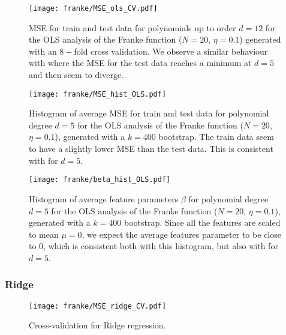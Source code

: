             
            \begin{figure}
                \texttt{[image: franke/MSE\_ols\_CV.pdf]}
                \caption{MSE for train and test data for polynomials up to order $d=12$ for the OLS analysis of the Franke function ($N=20$, $\eta=0.1$) generated with an $8-$fold cross validation. We observe a similar behaviour with  where the MSE for the test data reaches a minimum at $d=5$ and then seem to diverge. }
                \label{fig:cross-validation_ols}
            \end{figure}
            
            \begin{figure}
                \texttt{[image: franke/MSE\_hist\_OLS.pdf]}
                \caption{Histogram of average MSE for train and test data for polynomial degree $d=5$ for the OLS analysis of the Franke function ($N=20$, $\eta=0.1$), generated with a $k=400$ bootstrap. The train data seem to have a slightly lower MSE than the test data. This is consistent with  for $d=5$.}
                \label{fig:mse_hist_ols}
            \end{figure}


            \begin{figure}
                \texttt{[image: franke/beta\_hist\_OLS.pdf]}
                \caption{Histogram of average feature parameters $\beta$ for polynomial degree $d=5$ for the OLS analysis of the Franke function ($N=20$, $\eta=0.1$), generated with a $k=400$ bootstrap. Since all the features are scaled to mean $\mu=0$, we expect the average features parameter to be close to 0, which is consistent both with this histogram, but also with  for $d=5$. }
                \label{fig:beta_hist_ols}
            \end{figure}
            


        

        \subsubsection{Ridge}\label{sec:rigdeanalysis}

        \begin{figure}
            \texttt{[image: franke/MSE\_ridge\_CV.pdf]}
            \caption{Cross-validation for Ridge regression.}
            \label{fig:cross-validation_ridge}
        \end{figure}

